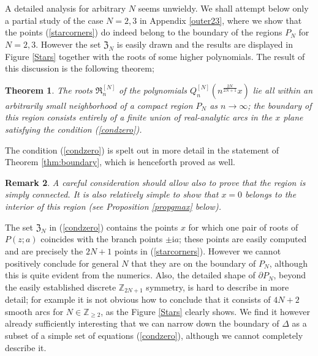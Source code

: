 \documentclass[10pt,reqno,oneside]{amsart}
\newcommand{\im}{\mathrm{i}}
\numberwithin{equation}{section}
\newtheorem{theo}{Theorem}[section]
\newtheorem{remark}[theo]{Remark}
\def\le{\left}
\def\ri{\right}
\def\br{\begin{remark}}
\def\er{\end{remark}}
\def \pa{\partial}
\def\Z{{\mathbb Z}}
\def\eqref#1{(\ref{#1})}
\begin{document}
A detailed analysis for arbitrary $N$ seems unwieldy. We shall attempt below only a partial study of the case $N=2,3$ in Appendix \ref{outer23}, where we show that the points \eqref{starcorners} do indeed belong to the boundary of the regions $P_N$ for $N=2,3$. However the set $\mathfrak Z_N$ is easily drawn and the results are displayed in Figure \ref{Stars} together with the roots of some higher polynomials. The result of this discussion is the following theorem;
 \begin{theo}
 The roots $\mathfrak R_n^{[N]}$  of the polynomials $Q_n^{[N]} \le( n^{\frac {2N}{2N+1}} x\ri)$ lie all within an arbitrarily small neighborhood of a compact region $P_N$ as $n\to \infty$;  the boundary of this region consists  entirely  of  a finite union of real-analytic arcs in the $x$ plane satisfying the condition \eqref{condzero}.
 \end{theo}
 The condition \eqref{condzero} is spelt out in more detail in the statement of Theorem \ref{thm:boundary}, which is henceforth proved as well.
 \br
 A careful consideration should allow also to prove that the region is simply connected. 
 It is also relatively simple to show that $x=0$ belongs to the interior of this region (see Proposition \ref{propgmax} below).
 \er
 
 The set $\mathfrak Z_N$ in \eqref{condzero} contains the points $x$ for which one pair of roots of $P(z;a)$ coincides with the branch points $\pm\im a$; these points are easily computed and are precisely the $2N+1$ points in \eqref{starcorners}. However we cannot positively conclude for general $N$ that they are on the boundary of $P_N$, although this is quite evident from the numerics. Also, the detailed shape of $\pa P_N$, beyond the easily established discrete $\Z_{2N+1}$ symmetry, is hard to describe in more detail; for example it is not obvious how to conclude that it consists of $4N+2$ smooth arcs for $N\in\mathbb{Z}_{\geq 2}$, as the Figure \ref{Stars} clearly shows.
 We find it however already sufficiently interesting that we can narrow down the boundary of $\Delta$ as a subset  of a simple set of equations \eqref{condzero}, although we cannot completely describe it.
 
%
\end{document}
